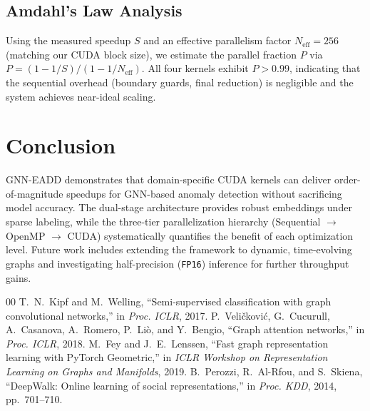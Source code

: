 \documentclass[conference]{IEEEtran}
\begin{document}
\subsection{Amdahl's Law Analysis}
Using the measured speedup $S$ and an effective parallelism factor $N_{\text{eff}} = 256$ (matching our CUDA block size), we estimate the parallel fraction $P$ via $P = (1 - 1/S)/(1 - 1/N_{\text{eff}})$. All four kernels exhibit $P > 0.99$, indicating that the sequential overhead (boundary guards, final reduction) is negligible and the system achieves near-ideal scaling.

\section{Conclusion}
GNN-EADD demonstrates that domain-specific CUDA kernels can deliver order-of-magnitude speedups for GNN-based anomaly detection without sacrificing model accuracy. The dual-stage architecture provides robust embeddings under sparse labeling, while the three-tier parallelization hierarchy (Sequential $\rightarrow$ OpenMP $\rightarrow$ CUDA) systematically quantifies the benefit of each optimization level. Future work includes extending the framework to dynamic, time-evolving graphs and investigating half-precision (\texttt{FP16}) inference for further throughput gains.

\begin{thebibliography}{00}
 T.~N.~Kipf and M.~Welling, ``Semi-supervised classification with graph convolutional networks,'' in \textit{Proc. ICLR}, 2017.
 P.~Veličković, G.~Cucurull, A.~Casanova, A.~Romero, P.~Liò, and Y.~Bengio, ``Graph attention networks,'' in \textit{Proc. ICLR}, 2018.
 M.~Fey and J.~E.~Lenssen, ``Fast graph representation learning with PyTorch Geometric,'' in \textit{ICLR Workshop on Representation Learning on Graphs and Manifolds}, 2019.
 B.~Perozzi, R.~Al-Rfou, and S.~Skiena, ``DeepWalk: Online learning of social representations,'' in \textit{Proc. KDD}, 2014, pp.~701--710.
\end{thebibliography}
\end{document}
